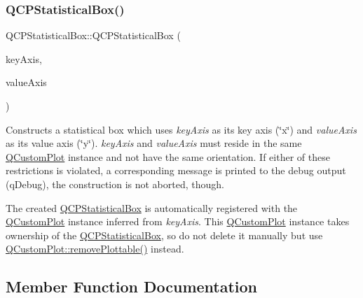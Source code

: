 \subsubsection{\texorpdfstring{QCPStatisticalBox()}{QCPStatisticalBox()}}
{\footnotesize\ttfamily Q\+C\+P\+Statistical\+Box\+::\+Q\+C\+P\+Statistical\+Box (\begin{DoxyParamCaption}\item[{\mbox{\hyperlink{class_q_c_p_axis}{Q\+C\+P\+Axis}} $\ast$}]{key\+Axis,  }\item[{\mbox{\hyperlink{class_q_c_p_axis}{Q\+C\+P\+Axis}} $\ast$}]{value\+Axis }\end{DoxyParamCaption})\hspace{0.3cm}{\ttfamily [explicit]}}

Constructs a statistical box which uses {\itshape key\+Axis} as its key axis (\char`\"{}x\char`\"{}) and {\itshape value\+Axis} as its value axis (\char`\"{}y\char`\"{}). {\itshape key\+Axis} and {\itshape value\+Axis} must reside in the same \mbox{\hyperlink{class_q_custom_plot}{Q\+Custom\+Plot}} instance and not have the same orientation. If either of these restrictions is violated, a corresponding message is printed to the debug output (q\+Debug), the construction is not aborted, though.

The created \mbox{\hyperlink{class_q_c_p_statistical_box}{Q\+C\+P\+Statistical\+Box}} is automatically registered with the \mbox{\hyperlink{class_q_custom_plot}{Q\+Custom\+Plot}} instance inferred from {\itshape key\+Axis}. This \mbox{\hyperlink{class_q_custom_plot}{Q\+Custom\+Plot}} instance takes ownership of the \mbox{\hyperlink{class_q_c_p_statistical_box}{Q\+C\+P\+Statistical\+Box}}, so do not delete it manually but use \mbox{\hyperlink{class_q_custom_plot_af3dafd56884208474f311d6226513ab2}{Q\+Custom\+Plot\+::remove\+Plottable()}} instead. 

\subsection{Member Function Documentation}
\mbox{\label{class_q_c_p_statistical_box_a9a8739c5b8291db8fd839e892fc8f478}} 
